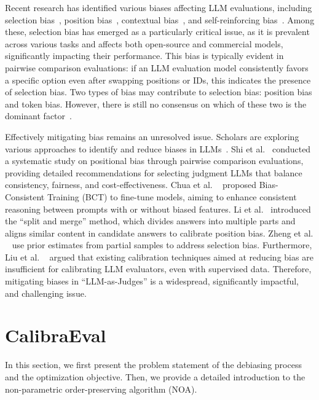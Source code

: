 \documentclass[sigconf]{acmart}
\begin{document}
Recent research has identified various biases affecting LLM evaluations, including selection bias~\cite{zheng2023judging}, position bias~\cite{li2023split}, contextual bias~\cite{zhou2023batch}, and self-reinforcing bias~\cite{li2023prd,zhang2024evaluationethicsllmslegal}. Among these, selection bias has emerged as a particularly critical issue, as it is prevalent across various tasks and affects both open-source and commercial models, significantly impacting their performance. This bias is typically evident in pairwise comparison evaluations: if an LLM evaluation model consistently favors a specific option even after swapping positions or IDs, this indicates the presence of selection bias. Two types of bias may contribute to selection bias: position bias and token bias. However, there is still no consensus on which of these two is the dominant factor~\cite{pezeshkpour2023large,raina2024llm}.


Effectively mitigating bias remains an unresolved issue. Scholars are exploring various approaches to identify and reduce biases in LLMs~\cite{shi2024judging,zhou2024mitigating,zhang2024evaluationethicsllmslegal}.
Shi et al.~\cite{shi2024judging} conducted a systematic study on positional bias through pairwise comparison evaluations, providing detailed recommendations for selecting judgment LLMs that balance consistency, fairness, and cost-effectiveness. Chua et al. ~\cite{chua2024bias} proposed Bias-Consistent Training (BCT) to fine-tune models, aiming to enhance consistent reasoning between prompts with or without biased features. Li et al.~\cite{li2023split} introduced the ``split and merge'' method, which divides answers into multiple parts and aligns similar content in candidate answers to calibrate position bias. Zheng et al. ~\cite{zheng2023large} use prior estimates from partial samples to address selection bias. Furthermore, Liu et al. ~\cite{liu2024aligning} argued that existing calibration techniques aimed at reducing bias are insufficient for calibrating LLM evaluators, even with supervised data.
Therefore, mitigating biases in ``LLM-as-Judges'' is a widespread, significantly impactful, and challenging issue.




\section{CalibraEval}

In this section, we first present the problem statement of the debiasing process and the optimization objective. Then, we provide a detailed introduction to the non-parametric order-preserving algorithm (NOA).
\end{document}
